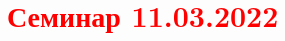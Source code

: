 \documentclass[main.tex]{subfiles}
\begin{document}
\section{\textcolor{red}{Семинар 11.03.2022}}
\end{document}
